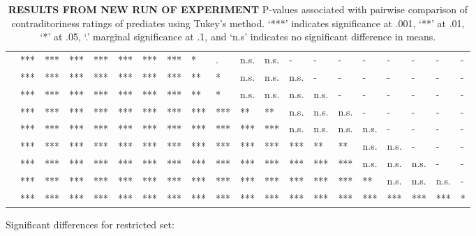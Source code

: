 \documentclass[11pt,fleqn]{article}
\newcommand{\6}{\mbox{$[\hspace*{-.6mm}[$}}
\newcommand{\9}{\mbox{$]\hspace*{-.6mm}]$}}
\begin{document}
\begin{landscape}
\begin{table}[h!]
\begin{tabular}{l l l l l l l l l l l l l l l l l l l l }
\color{green}{\em admit}\color{black}			& *** & *** & *** & *** & *** & *** & *** & * & . & n.s. & n.s. & - & - & - & - & - & - & - & - \\
\color{blue}{\em establish}\color{black}		& *** & *** & *** & *** & *** & *** & *** & ** & * & n.s. & n.s. &  n.s. & - & - & - & - & - & - & - \\
\color{green}{\em demonstrate}\color{black}	& *** & *** & *** & *** & *** & *** & *** & ** & * & n.s. & n.s. & n.s. & n.s. & - & - & - & - & - & - \\
\color{green}{\em confirm}\color{black}		& *** & *** & *** & *** & *** & *** & *** & *** & *** & ** & ** & n.s. & n.s. & n.s. & - & - & - & - & - \\
\color{blue}{\em discover}\color{black}		& *** & *** & *** & *** & *** & *** & *** & *** & *** & *** & *** & n.s. & n.s. & n.s. & n.s. & - & - & - & - \\
\color{blue}{\em see}\color{black}			& *** & *** & *** & *** & *** & *** & *** & *** & *** & *** & *** & *** & ** & ** & n.s. & n.s. & - & - & - \\
\color{blue}{\em know}\color{black}			& *** & *** & *** & *** & *** & *** & *** & *** & *** & *** & *** & *** & *** & *** & n.s. & n.s. & n.s. & - & - \\
\color{green}{\em prove}\color{black}			& *** & *** & *** & *** & *** & *** & *** & *** & *** & *** & *** & *** & *** & *** & ** & n.s. & n.s. & n.s. & -  \\
\color{blue}{\em be right}\color{black}		& *** & *** & *** & *** & *** & *** & *** & *** & ***  & ***  & *** & *** & *** & *** & *** & *** & *** & *** & *  \\

\bottomrule
\end{tabular}
\caption{{\bf RESULTS FROM NEW RUN OF EXPERIMENT} P-values associated with pairwise comparison of contraditoriness ratings of prediates using Tukey's method. `***' indicates significance at .001, `**' at .01, `*' at .05, `.' marginal significance at .1, and `n.s' indicates no significant difference in means.}\label{t-pairwise}
\end{table}
\end{landscape}


\newpage

Significant differences for restricted set:
\end{document}
